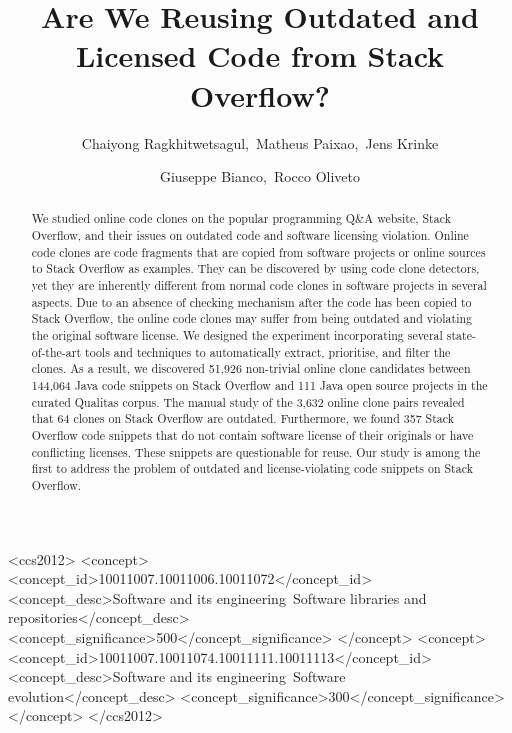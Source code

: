 \documentclass[sigconf,review, anonymous]{acmart}
\begin{document}
	\title{Are We Reusing Outdated and Licensed Code from Stack Overflow?}
	
\author{Chaiyong Ragkhitwetsagul,~Matheus Paixao,~Jens Krinke}

\author{Giuseppe Bianco,~Rocco Oliveto}

\begin{abstract}
	We studied online code clones on the popular programming Q\&A website, Stack Overflow, and their issues on outdated code and software licensing violation. Online code clones are code fragments that are copied from software projects or online sources to Stack Overflow as examples. They can be discovered by using code clone detectors, yet they are inherently different from normal code clones in software projects in several aspects. Due to an absence of checking mechanism after the code has been copied to Stack Overflow, the online code clones may suffer from being outdated and violating the original software license. %
	We designed the experiment incorporating several state-of-the-art tools and techniques to automatically extract, prioritise, and filter the clones. As a result, we discovered 51,926 non-trivial online clone candidates between 144,064 Java code snippets on Stack Overflow and 111 Java open source projects in the curated Qualitas corpus. The manual study of the 3,632 online clone pairs revealed that 64 clones on Stack Overflow are outdated. Furthermore, we found 357 Stack Overflow code snippets that do not contain software license of their originals or have conflicting licenses. These snippets are questionable for reuse. Our study is among the first to address the problem of outdated and license-violating code snippets on Stack Overflow.
\end{abstract}

\begin{CCSXML}
	<ccs2012>
	<concept>
	<concept_id>10011007.10011006.10011072</concept_id>
	<concept_desc>Software and its engineering~Software libraries and repositories</concept_desc>
	<concept_significance>500</concept_significance>
	</concept>
	<concept>
	<concept_id>10011007.10011074.10011111.10011113</concept_id>
	<concept_desc>Software and its engineering~Software evolution</concept_desc>
	<concept_significance>300</concept_significance>
	</concept>
	</ccs2012>
\end{CCSXML}
\end{document}
